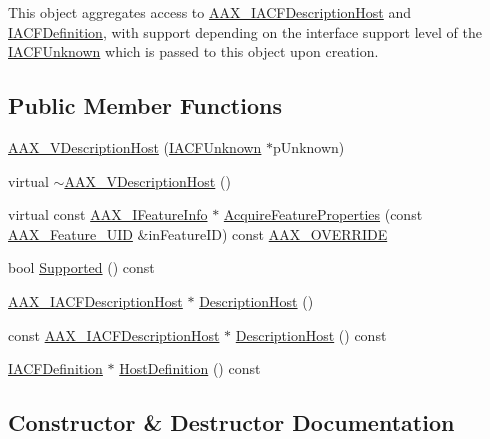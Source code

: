 This object aggregates access to \hyperlink{a00056}{A\+A\+X\+\_\+\+I\+A\+C\+F\+Description\+Host} and \hyperlink{a00145}{I\+A\+C\+F\+Definition}, with support depending on the interface support level of the \hyperlink{a00146}{I\+A\+C\+F\+Unknown} which is passed to this object upon creation. \subsection*{Public Member Functions}
\begin{DoxyCompactItemize}
\item 
\hyperlink{a00133_a07eba69ed3cbafb4f9cd5c04030903c1}{A\+A\+X\+\_\+\+V\+Description\+Host} (\hyperlink{a00146}{I\+A\+C\+F\+Unknown} $\ast$p\+Unknown)
\item 
virtual \hyperlink{a00133_ae62fcaae41a924a81a16d50a6c76109b}{$\sim$\+A\+A\+X\+\_\+\+V\+Description\+Host} ()
\item 
virtual const \hyperlink{a00100}{A\+A\+X\+\_\+\+I\+Feature\+Info} $\ast$ \hyperlink{a00133_a794b4e57c1260ff9b438733a7cf9882b}{Acquire\+Feature\+Properties} (const \hyperlink{a00149_a53d6cf8a08224b3e813333e411ce798e}{A\+A\+X\+\_\+\+Feature\+\_\+\+U\+I\+D} \&in\+Feature\+I\+D) const \hyperlink{a00149_ac2f24a5172689ae684344abdcce55463}{A\+A\+X\+\_\+\+O\+V\+E\+R\+R\+I\+D\+E}
\item 
bool \hyperlink{a00133_aa5a445922084bc6c140d7e6c6f550f7f}{Supported} () const 
\item 
\hyperlink{a00056}{A\+A\+X\+\_\+\+I\+A\+C\+F\+Description\+Host} $\ast$ \hyperlink{a00133_a92f91b44add592e217499c1674ee76df}{Description\+Host} ()
\item 
const \hyperlink{a00056}{A\+A\+X\+\_\+\+I\+A\+C\+F\+Description\+Host} $\ast$ \hyperlink{a00133_a8a5254f9eb7db920b9aaa38e68beaa17}{Description\+Host} () const 
\item 
\hyperlink{a00145}{I\+A\+C\+F\+Definition} $\ast$ \hyperlink{a00133_aea691adb8d4c3e88c436301f8f47c272}{Host\+Definition} () const 
\end{DoxyCompactItemize}


\subsection{Constructor \& Destructor Documentation}
\hypertarget{a00133_a07eba69ed3cbafb4f9cd5c04030903c1}{}
